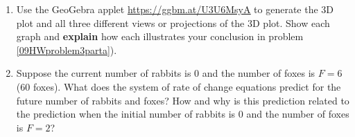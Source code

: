 \begin{enumerate}
\begin{enumerate}
\item Use the GeoGebra applet \href{https://ggbm.at/U3U6MsyA}{\underline{https://ggbm.at/U3U6MsyA}} to generate the 3D plot and all three different views or projections of the 3D plot. Show each graph and \textbf{explain} how each illustrates your conclusion in problem \ref{09HWproblem3parta}). \label{09HWproblem3partb}

\item Suppose the current number of rabbits is 0 and the number of foxes is $F=6$ (60 foxes). What does the system of rate of change equations predict for the future number of rabbits and foxes? How and why is this prediction related to the prediction when the initial number of rabbits is 0 and the number of foxes is $F=2$? \label{09HWproblem3partc}
\end{enumerate}

\clearpage


\end{enumerate}
